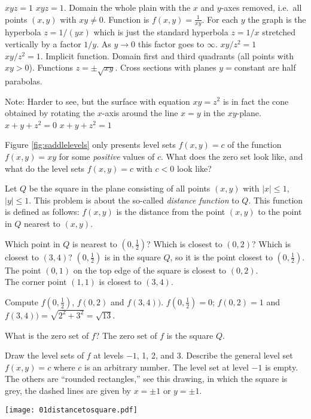 \endanswer
\subprob $xyz=1$
\answer
$xyz=1$. 
Domain the whole plain with the $x$ and $y$-axes removed, i.e.\ all
points $(x, y)$ with $xy\ne0$.
Function is $f(x, y) = \frac{1} {xy}$.
For each $y$ the graph is the hyperbola $z=1/(yx)$ which is just the
standard hyperbola $z=1/x$ stretched vertically by a factor $1/y$.
As $y\to 0$ this factor goes to $\infty$.
\endanswer
\subprob $xy/z^2=1$\\
\answer
$xy/z^2=1$.
Implicit function.
Domain first and third quadrants (all points with $xy>0$).
Functions $z= \pm \sqrt{xy}$.
Cross sections with planes $y=$constant are half parabolas.

Note: Harder to see, but the surface with equation $xy=z^2$ is in fact
the cone obtained by rotating the $x$-axis around the line
$x=y$ in the $xy$-plane.
\endanswer
\subprob $x+y+z^2=0$
\subprob $x+y+z^2=1$

\problem Figure \ref{fig:saddlelevels} only presents level sets
$f(x, y)=c$ of the function $f(x, y) = xy$ for some \emph{positive} values
of $c$.  What does the zero set look like, and what do the level sets
$f(x, y) = c$ with $c<0$ look like?

\problem 
\label{prb:distance-to-square-level-sets}
Let $Q$ be the square in the plane consisting of all points $(x,y)$
with $|x|\le1$, $|y|\le1$.  This problem is about the so-called
\emph{distance function} to $Q$.  This function is defined as
follows:  $f(x, y)$ is the distance from the point $(x,y)$ to the
point in $Q$ nearest to $(x,y)$.

\subprob Which point in $Q$ is nearest to $(0, \frac12)$?  Which is
closest to $(0, 2)$?  Which is closest to $(3,4)$?
\answer
$(0, \frac{1} {2})$ is in the square $Q$, so it is the point closest to
$(0, \frac{1} {2})$.\\
The point $(0,1)$ on the top edge of the square is closest to $(0,2)$.\\
The corner point $(1,1)$ is closest to $(3,4)$.
\endanswer

\subprob Compute $f(0, \frac12)$, $f(0,2)$ and $f(3, 4))$.
\answer
$f(0, \frac12) =0 $;
$f(0,2)=1$ and $f(3, 4))=\sqrt{2^2+3^2}=\sqrt{13}$.
\endanswer

\subprob What is the zero set of $f$?
\answer
The zero set of $f$ is the square $Q$.
\endanswer

\subprob Draw the level sets of $f$ at levels $-1$, 1, 2, and 3.  Describe
the general level set $f(x, y) = c$ where $c$ is an arbitrary number.
\answer
The level set at level $-1$ is empty.  The others are ``rounded
rectangles,'' see this drawing, in which the square is grey, the dashed
lines are given by $x=\pm1$ or $y=\pm1$.
\begin{center}
    \texttt{[image: 01distancetosquare.pdf]}
\end{center}
\endanswer

